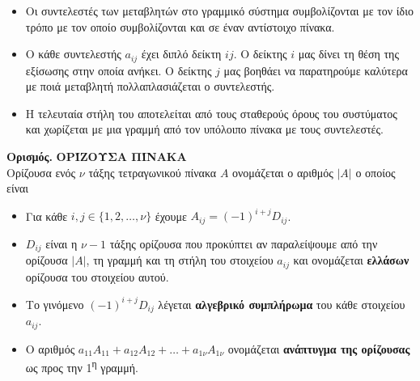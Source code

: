 \documentclass[twoside,10pt]{book}
\newcounter{orismos}[chapter]
\renewcommand{\theorismos}{\thechapter.\arabic{orismos}}
\newcommand{\Orismos}[1]{\refstepcounter{orismos}\textcolor{red!80!black}{\large{\textbf{Ορισμός\hspace{2mm}\theorismos\hspace{1mm}}}} \MakeUppercase{\textbf{#1}}\\}{}
\begin{document}
\begin{itemize}
\item Οι συντελεστές των μεταβλητών στο γραμμικό σύστημα συμβολίζονται με τον ίδιο τρόπο με τον οποίο συμβολίζονται και σε έναν αντίστοιχο πίνακα.
\item Ο κάθε συντελεστής $ a_{ij} $ έχει διπλό δείκτη $ ij $. Ο δείκτης $ i $ μας δίνει τη θέση της εξίσωσης στην οποία ανήκει. Ο δείκτης $ j $ μας βοηθάει να παρατηρούμε καλύτερα με ποιά μεταβλητή πολλαπλασιάζεται ο συντελεστής.
\item Η τελευταία στήλη του αποτελείται από τους σταθερούς όρους του συστύματος και χωρίζεται με μια γραμμή από τον υπόλοιπο πίνακα με τους συντελεστές.
\end{itemize} 
\Orismos{Ορίζουσα πίνακα}
Ορίζουσα ενός $ \nu $ τάξης τετραγωνικού πίνακα $ A $ ονομάζεται ο αριθμός $ |A| $ ο οποίος είναι
\begin{center}
\end{center} 
\begin{itemize}[itemsep=0mm]
\item Για κάθε $ i,j\in\{1,2,\ldots,\nu\} $ έχουμε $ A_{ij}=(-1)^{i+j}D_{ij} $.
\item $ D_{ij} $ είναι η $ \nu-1 $ τάξης ορίζουσα που προκύπτει αν παραλείψουμε από την ορίζουσα $ |A| $, τη γραμμή και τη στήλη του στοιχείου $ a_{ij} $ και ονομάζεται \textbf{ελλάσων} ορίζουσα του στοιχείου αυτού.
\item Το γινόμενο $ (-1)^{i+j}D_{ij} $ λέγεται \textbf{αλγεβρικό συμπλήρωμα} του κάθε στοιχείου $ a_{ij} $.
\item Ο αριθμός $ a_{11}A_{11}+a_{12}A_{12}+\ldots+a_{1\nu}A_{1\nu} $ ονομάζεται \textbf{ανάπτυγμα της ορίζουσας} ως προς την 1\textsuperscript{η} γραμμή.
\end{itemize}
\end{document}
